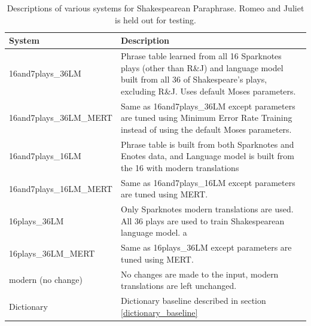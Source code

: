 \documentclass[10pt,a5paper,twoside]{article}
\begin{document}
\begin{table}[ht]
  \begin{center}
    \begin{tabular}{|l|p{3in}|}
      \hline
      System & Description \\
      \hline
      \hline
      16and7plays\_36LM & Phrase table learned from all 16 Sparknotes plays (other than R\&J) and language model built from all 36 of Shakespeare's plays, excluding R\&J.
      Uses default Moses parameters. \\
      \hline
      16and7plays\_36LM\_MERT & Same as 16and7plays\_36LM except parameters are tuned using Minimum Error Rate Training \cite{MERT} instead of using the default Moses parameters.\\
      \hline
      16and7plays\_16LM & Phrase table is built from both Sparknotes and Enotes data, and Language model is built from the 16 with modern translations\\
      \hline
      16and7plays\_16LM\_MERT & Same as 16and7plays\_16LM except parameters are tuned using MERT. \\
      \hline
      16plays\_36LM & Only Sparknotes modern translations are used.  All 36 plays are used to train Shakespearean language model. a\\
      \hline
      16plays\_36LM\_MERT & Same as 16plays\_36LM except parameters are tuned using MERT. \\
      \hline
      modern (no change) & No changes are made to the input, modern translations are left unchanged. \\
      \hline
      Dictionary & Dictionary baseline described in section \ref{dictionary_baseline}\\
      \hline
    \end{tabular}
  \end{center}
  \caption{Descriptions of various systems for Shakespearean Paraphrase.  Romeo and Juliet is held out for testing.}
  \label{systems}
\end{table}
\end{document}
